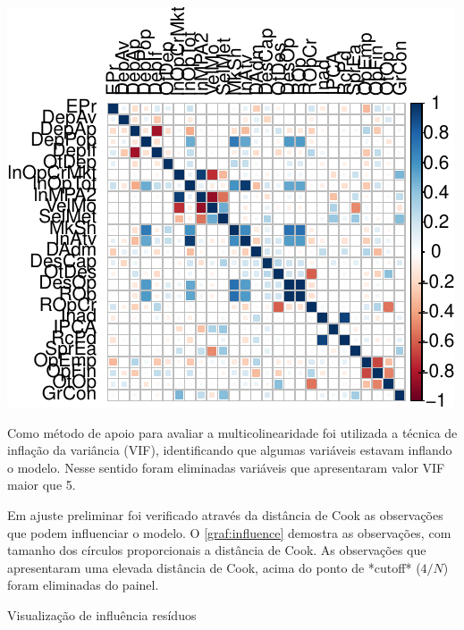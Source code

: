 \documentclass[
  12pt,
  12pt,
  openright,
  oneside,
  a4paper,
  chapter=TITLE,
  section=TITLE,
  subsection=TITLE,
  subsubsection=TITLE,
  english,
  portugues,
  sumario=tradicional]{abntex2}
\begin{document}
\begin{apendicesenv}
\begin{grafico}[!htbp]
\begin{center}\includegraphics{12-exportedfigures/chart.correlation-1} \end{center}
\vspace{-3mm}
\label{graf:corr}
\vspace{-2mm}
\end{grafico}

Como método de apoio para avaliar a multicolinearidade foi utilizada a técnica de inflação da variância (VIF), identificando que algumas variáveis estavam inflando o modelo. Nesse sentido foram eliminadas variáveis que apresentaram valor VIF maior que 5.

Em ajuste preliminar foi verificado através da distância de Cook as observações que podem influenciar o modelo. O \autoref{graf:influence} demostra as observações, com tamanho dos círculos proporcionais a distância de Cook. As observações que apresentaram uma elevada distância de Cook, acima do ponto de *cutoff*  ($4/N$) foram eliminadas do painel.    




\begin{grafico}[!htbp]
\vspace{20pt}
\caption{Visualização de influência resíduos}
\vspace{-4mm}


\end{grafico}
\end{apendicesenv}
\end{document}
